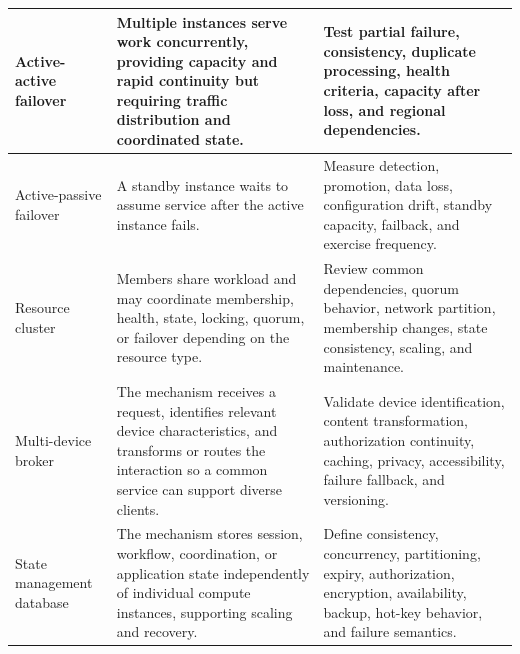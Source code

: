 \documentclass[11pt]{article}
\begin{document}
\begin{longtable}{@{}>{\RaggedRight\arraybackslash}p{}>{\RaggedRight\arraybackslash}p{}>{\RaggedRight\arraybackslash}p{}@{}}
Active-active failover & Multiple instances serve work concurrently, providing capacity and rapid continuity but requiring traffic distribution and coordinated state. & Test partial failure, consistency, duplicate processing, health criteria, capacity after loss, and regional dependencies. \\\midrule
Active-passive failover & A standby instance waits to assume service after the active instance fails. & Measure detection, promotion, data loss, configuration drift, standby capacity, failback, and exercise frequency. \\\midrule
Resource cluster & Members share workload and may coordinate membership, health, state, locking, quorum, or failover depending on the resource type. & Review common dependencies, quorum behavior, network partition, membership changes, state consistency, scaling, and maintenance. \\\midrule
Multi-device broker & The mechanism receives a request, identifies relevant device characteristics, and transforms or routes the interaction so a common service can support diverse clients. & Validate device identification, content transformation, authorization continuity, caching, privacy, accessibility, failure fallback, and versioning. \\\midrule
State management database & The mechanism stores session, workflow, coordination, or application state independently of individual compute instances, supporting scaling and recovery. & Define consistency, concurrency, partitioning, expiry, authorization, encryption, availability, backup, hot-key behavior, and failure semantics. \\\midrule
\bottomrule
\end{longtable}
\endgroup
\end{document}
